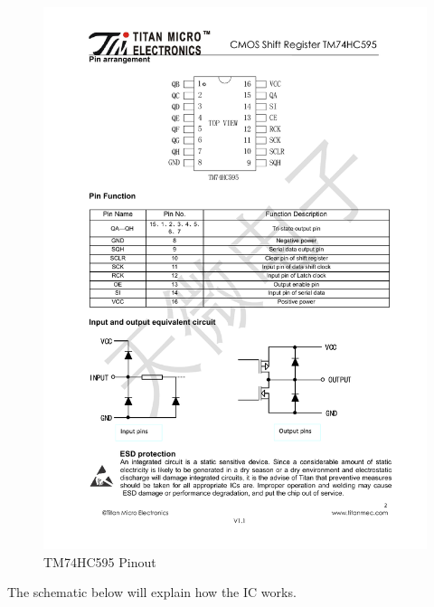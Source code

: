 \documentclass[13pt,a4paper,twoside]{report}
\begin{document}
\begin{figure}[H]
\centering
\includegraphics[scale=0.6]{images/tm74hc595_ic.pdf}
\caption{TM74HC595 Pinout\protect\footnotemark}
\end{figure}


The schematic below will explain how the IC works.
\end{document}
